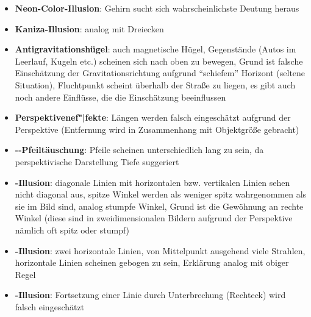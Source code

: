 \linie
\begin{itemize}
    \item
    \textbf{Neon-Color-Illusion}:
    Gehirn sucht sich wahrscheinlichste Deutung heraus
    
    \item
    \textbf{Kaniza-Illusion}:
    analog mit Dreiecken
\end{itemize}
\linie
\begin{itemize}
    \item
    \textbf{Antigravitationshügel}:
    auch magnetische Hügel,
    Gegenstände (Autos im Leerlauf, Kugeln etc.) scheinen sich nach oben
    zu bewegen,
    Grund ist falsche Einschätzung der Gravitationsrichtung aufgrund
    "`schiefem"' Horizont (seltene Situation),
    Fluchtpunkt scheint überhalb der Straße zu liegen,
    es gibt auch noch andere Einflüsse, die die Einschätzung beeinflussen
\end{itemize}
\linie
\begin{itemize}
    \item
    \textbf{Perspektivenef"|fekte}:
    Längen werden falsch eingeschätzt aufgrund der Perspektive
    (Entfernung wird in Zusammenhang mit Objektgröße gebracht)
    
    \item
    \textbf{--Pfeiltäuschung}:
    Pfeile scheinen unterschiedlich lang zu sein,
    da perspektivische Darstellung Tiefe suggeriert
    
    \item
    \textbf{-Illusion}:
    diagonale Linien mit horizontalen bzw. vertikalen Linien
    sehen nicht diagonal aus,
    spitze Winkel werden als weniger spitz wahrgenommen als sie im Bild sind,
    analog stumpfe Winkel,
    Grund ist die Gewöhnung an rechte Winkel
    (diese sind in zweidimensionalen Bildern aufgrund der Perspektive
    nämlich oft spitz oder stumpf)
    
    \item
    \textbf{-Illusion}:
    zwei horizontale Linien, von Mittelpunkt ausgehend viele Strahlen,
    horizontale Linien scheinen gebogen zu sein,
    Erklärung analog mit obiger Regel
    
    \item
    \textbf{-Illusion}:
    Fortsetzung einer Linie durch Unterbrechung (Rechteck) wird falsch
    eingeschätzt
\end{itemize}

\pagebreak

